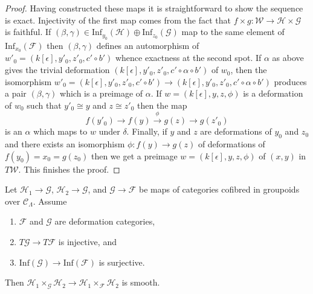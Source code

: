 \begin{proof}
\medskip\noindent
Having constructed these maps it is straightforward to show the sequence
is exact. Injectivity of the first map comes from the fact that
$f \times g : \mathcal{W} \to \mathcal{H} \times \mathcal{G}$
is faithful. If
$(\beta, \gamma) \in
\text{Inf}_{y_0}(\mathcal{H}) \oplus \text{Inf}_{z_0}(\mathcal{G})$
map to the same element of $\text{Inf}_{x_0}(\mathcal{F})$ then
$(\beta, \gamma)$ defines an automorphism of
$w'_0 = (k[\epsilon], y'_0, z'_0, c' \circ b')$ whence exactness
at the second spot. If $\alpha$ as above gives the trivial deformation
$(k[\epsilon], y'_0, z'_0, c' \circ \alpha \circ b')$
of $w_0$, then the isomorphism
$w'_0 = (k[\epsilon], y'_0, z'_0, c' \circ b') \to
(k[\epsilon], y'_0, z'_0, c' \circ \alpha \circ b')$
produces a pair $(\beta, \gamma)$ which is a preimage of $\alpha$.
If $w = (k[\epsilon], y, z, \phi)$ is a deformation of $w_0$
such that $y'_0 \cong y$ and $z \cong z'_0$ then the map
$$
f(y'_0) \to f(y) \xrightarrow{\phi} g(z) \to g(z'_0)
$$
is an $\alpha$ which maps to $w$ under $\delta$.
Finally, if $y$ and $z$ are deformations of $y_0$ and $z_0$
and there exists an isomorphism $\phi : f(y) \to g(z)$ of deformations
of $f(y_0) = x_0 = g(z_0)$ then we get a preimage
$w = (k[\epsilon], y, z, \phi)$ of $(x, y)$ in $T\mathcal{W}$.
This finishes the proof.
\end{proof}

\begin{lemma}
\label{lemma-map-fibre-products-smooth}
Let $\mathcal{H}_1 \to \mathcal{G}$, $\mathcal{H}_2 \to \mathcal{G}$, and
$\mathcal{G} \to \mathcal{F}$ be maps of categories cofibred in groupoids
over $\mathcal{C}_\Lambda$. Assume
\begin{enumerate}
\item $\mathcal{F}$ and $\mathcal{G}$ are deformation categories,
\item $T\mathcal{G} \to T\mathcal{F}$ is injective, and
\item $\text{Inf}(\mathcal{G}) \to \text{Inf}(\mathcal{F})$ is surjective.
\end{enumerate}
Then $\mathcal{H}_1 \times_\mathcal{G} \mathcal{H}_2 \to
\mathcal{H}_1 \times_\mathcal{F} \mathcal{H}_2$ is smooth.
\end{lemma}

